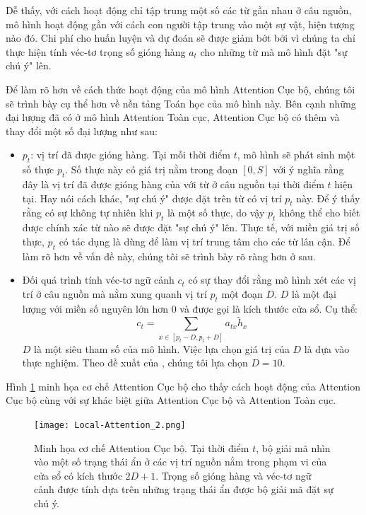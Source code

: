 Dễ thấy, với cách hoạt động chỉ tập trung một số các từ gần nhau ở câu nguồn, mô hình hoạt động gần với cách con người tập trung vào một sự vật, hiện tượng nào đó. Chi phí cho huấn luyện và dự đoán sẽ được giảm bớt bởi vì chúng ta chỉ thực hiện tính véc-tơ trọng số gióng hàng $a_t$ cho những từ mà mô hình đặt "sự chú ý" lên.

Để làm rõ hơn về cách thức hoạt động của mô hình Attention Cục bộ, chúng tôi sẽ trình bày cụ thể hơn về nền tảng Toán học của mô hình này. Bên cạnh những đại lượng đã có ở mô hình Attention Toàn cục, Attention Cục bộ có thêm và thay đổi một số đại lượng như sau:
\begin{itemize}
	\item $p_t$: vị trí đã được gióng hàng. Tại mỗi thời điểm $t$, mô hình sẽ phát sinh một số thực $p_t$. Số thực này có giá trị nằm trong đoạn $[0, S]$ với ý nghĩa rằng đây là vị trí đã được gióng hàng của với từ ở câu nguồn tại thời điểm $t$ hiện tại. Hay nói cách khác, "sự chú ý" được đặt trên từ có vị trí $p_t$ này. Để ý thấy rằng có sự không tự nhiên khi $p_t$ là một số thực, do vậy $p_t$ không thể cho biết được chính xác từ nào sẽ được đặt "sự chú ý" lên. Thực tế, với miền giá trị số thực, $p_t$ có tác dụng là dùng để làm vị trí trung tâm cho các từ lân cận. Để làm rõ hơn về vấn đề này, chúng tôi sẽ trình bày rõ ràng hơn ở sau.
	\item Đối quá trình tính véc-tơ ngữ cảnh $c_t$ có sự thay đổi rằng mô hình xét các vị trí ở câu nguồn mà nằm xung quanh vị trí $p_t$ một đoạn $D$. $D$ là một đại lượng với miền số nguyên lớn hơn 0 và được gọi là kích thước cửa sổ. Cụ thể:
	\begin{equation}
	c_t = \sum_{x \in [p_t - D, p_t + D]} a_{tx}\tilde{h}_x
	\end{equation}
	$D$ là một siêu tham số của mô hình. Việc lựa chọn giá trị của $D$ là dựa vào thực nghiệm. Theo đề xuất của \cite{attentionThangLuong2015}, chúng tôi lựa chọn $D = 10$.
\end{itemize}

Hình \ref{fig_Local_Attention} minh họa cơ chế Attention Cục bộ cho thấy cách hoạt động của Attention Cục bộ cùng với sự khác biệt giữa Attention Cục bộ và Attention Toàn cục.

\begin{figure}
	\centering
	\texttt{[image: Local-Attention\_2.png]}
	\caption[Minh họa cơ chế Attention Cục bộ.]{Minh họa cơ chế Attention Cục bộ. Tại thời điểm $t$, bộ giải mã nhìn vào một số trạng thái ẩn ở các vị trí nguồn nằm trong phạm vi của cửa sổ có kích thước $2D + 1$. Trọng số gióng hàng và véc-tơ ngữ cảnh được tính dựa trên những trạng thái ẩn được bộ giải mã đặt sự chú ý.}
	\label{fig_Local_Attention}
\end{figure}

